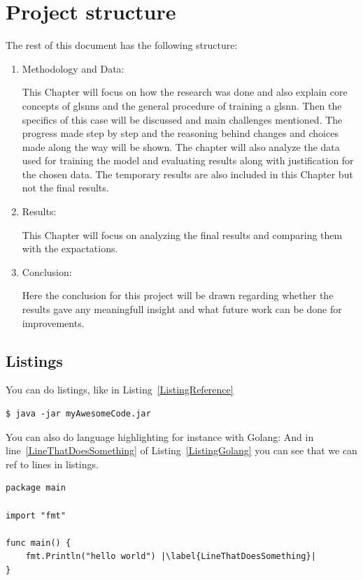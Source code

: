 \section{Project structure}

The rest of this document has the following structure:

\begin{enumerate}

\item Methodology and Data:

This Chapter will focus on how the research was done and also explain core concepts of gls{nn}s and the general procedure of training a gls{nn}. Then the specifics of this case will be discussed and main challenges mentioned. The progress made step by step and the reasoning behind changes and choices made along the way will be shown. The chapter will also analyze the data used for training the model and evaluating results along with justification for the chosen data. The temporary results are also included in this Chapter but not the final results.

\item Results:

This Chapter will focus on analyzing the final results and comparing them with the expactations.

\item Conclusion:

Here the conclusion for this project will be drawn regarding whether the results gave any meaningfull insight and what future work can be done for improvements.

\end{enumerate}


\subsection{Listings}
You can do listings, like in Listing~\ref{ListingReference}
\begin{lstlisting}[caption={[Short caption]Look at this cool listing. Find the rest in Appendix~\ref{Listing}},label=ListingReference]
$ java -jar myAwesomeCode.jar
\end{lstlisting}

You can also do language highlighting for instance with Golang:
And in line~\ref{LineThatDoesSomething} of Listing~\ref{ListingGolang} you can see that we can ref to lines in listings.

\begin{lstlisting}[caption={Hello world in Golang},label=ListingGolang,escapechar=|]
package main

import "fmt"

func main() {
    fmt.Println("hello world") |\label{LineThatDoesSomething}|
}

\end{lstlisting}

